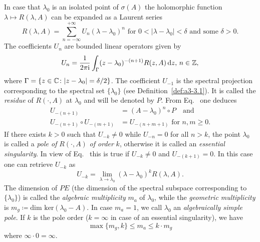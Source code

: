 \begin{example}\label{ex:a3-3.6}%

In case that $\lambda_{0}$ is an isolated point of\/ $\sigma(A)$ the holomorphic function $\lambda \mapsto R(\lambda,A)$ can be expanded as a Laurent series
\[
R(\lambda,A) = \sum_{n=-\infty}^{+\infty} U_{n}(\lambda - \lambda_{0})^{n} \text{ for } 0 < |\lambda - \lambda_{0}| < \delta \text{ and some } \delta > 0 .
\]
The coefficients $U_{n}$ are bounded linear operators given by
\begin{equation}\label{eq:a3-3.1}
	U_{n} = \frac{1}{2\pi\mathrm{i} }\int_{\Gamma} (z - \lambda_{0})^{-(n+1)}R(z,A)  \mathop{}\!\mathrm{d}{z}, \, n \in \mathbb{Z} ,
\end{equation}
where $\Gamma = \{z \in \mathbb{C} \colon |z - \lambda_{0}| = \delta/2\}$.
The coefficient $U_{-1}$ is the spectral projection corresponding to the spectral set $\{\lambda_{0}\}$ (see Definition~\ref{def:a3-3.1}).
It is called the \emph{residue} of\/ $R(\cdot,A)$ at $\lambda_{0}$ and will be denoted by $P$.
From Eq.~ one deduces
\begin{equation}\label{eq:a3-3.2}
\begin{split}
U_{-(n+1)} &= (A - \lambda_{0})^{n} \circ P \quad \text{and} \\
U_{-(n+1)} \circ U_{-(m+1)} &= U_{-(n+m+1)} \text{ for } n, m \geq 0 .  
\end{split}
\end{equation}
If there exists $k > 0$ such that $U_{-k} \neq 0$ while $U_{-n} = 0$ for all $n > k$, the point $\lambda_{0}$ is called a \emph{pole of} $R(\cdot,A)$ \emph{of order} $k$, otherwise it is called an \emph{essential singularity}. 
In view of Eq.~ this is true if\/ $U_{-k} \neq 0$ and $U_{-(k+1)} = 0$.
In this case one can retrieve $U_{-k}$ as
\begin{equation}\label{eq:a3-3.3}
U_{-k} = \lim_{\lambda \to \lambda_{0}}(\lambda - \lambda_{0})^{k}R(\lambda,A) .
\end{equation}
The dimension of\/ $PE$ (\ie the dimension of the spectral subspace corresponding to $\{\lambda_{0}\}$) is called the \emph{algebraic multiplicity} 
$m_{a}$ of\/ $\lambda_{0}$, while the \emph{geometric multiplicity} 
is $m_{g} \coloneq \text{dim ker}(\lambda_{0} - A)$.
In case $m_{a} = 1$, we call $\lambda_{0}$ an \emph{algebraically simple pole}.
If\/ $k$ is the pole order ($k = \infty$ in case of an essential singularity), we have
\begin{equation}\label{eq:a3-3.4}
	\max\{m_{g},k\} \leq m_{a} \leq k \cdot m_{g}
\end{equation}
where $\infty \cdot 0 = \infty$.


\end{example}
